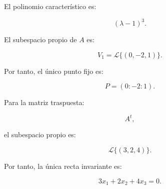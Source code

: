 \documentclass[11pt,a4paper]{article}
\begin{document}
El polinomio característico es:

\[
(\lambda-1)^3.
\]

El subespacio propio de \(A\) es:

\[
V_1=
\mathcal L\{(0,-2,1)\}.
\]

Por tanto, el único punto fijo es:

\[
\boxed{
P=(0:-2:1).
}
\]

Para la matriz traspuesta:

\[
A^t,
\]

el subespacio propio es:

\[
\mathcal L\{(3,2,4)\}.
\]

Por tanto, la única recta invariante es:

\[
\boxed{
3x_1+2x_2+4x_3=0.
}
\]
\end{document}
